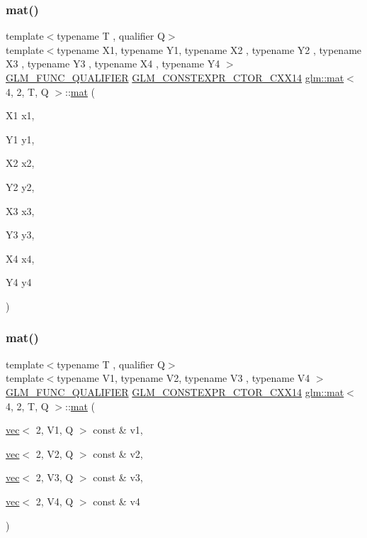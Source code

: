 \subsubsection{\texorpdfstring{mat()}{mat()}\hspace{0.1cm}{\footnotesize\ttfamily [19/21]}}
{\footnotesize\ttfamily template$<$typename T , qualifier Q$>$ \\
template$<$typename X1, typename Y1, typename X2 , typename Y2 , typename X3 , typename Y3 , typename X4 , typename Y4 $>$ \\
\hyperlink{setup_8hpp_a33fdea6f91c5f834105f7415e2a64407}{G\+L\+M\+\_\+\+F\+U\+N\+C\+\_\+\+Q\+U\+A\+L\+I\+F\+I\+ER} \hyperlink{setup_8hpp_a0900f9145e68bf6061b6f5e7be3fa751}{G\+L\+M\+\_\+\+C\+O\+N\+S\+T\+E\+X\+P\+R\+\_\+\+C\+T\+O\+R\+\_\+\+C\+X\+X14} \hyperlink{structglm_1_1mat}{glm\+::mat}$<$ 4, 2, T, Q $>$\+::\hyperlink{structglm_1_1mat}{mat} (\begin{DoxyParamCaption}\item[{X1}]{x1,  }\item[{Y1}]{y1,  }\item[{X2}]{x2,  }\item[{Y2}]{y2,  }\item[{X3}]{x3,  }\item[{Y3}]{y3,  }\item[{X4}]{x4,  }\item[{Y4}]{y4 }\end{DoxyParamCaption})}

\mbox{\label{structglm_1_1mat_3_014_00_012_00_01_t_00_01_q_01_4_ae4f422e3a1f8e3fa42d2782ec06a8200}} 
\subsubsection{\texorpdfstring{mat()}{mat()}\hspace{0.1cm}{\footnotesize\ttfamily [20/21]}}
{\footnotesize\ttfamily template$<$typename T , qualifier Q$>$ \\
template$<$typename V1, typename V2, typename V3 , typename V4 $>$ \\
\hyperlink{setup_8hpp_a33fdea6f91c5f834105f7415e2a64407}{G\+L\+M\+\_\+\+F\+U\+N\+C\+\_\+\+Q\+U\+A\+L\+I\+F\+I\+ER} \hyperlink{setup_8hpp_a0900f9145e68bf6061b6f5e7be3fa751}{G\+L\+M\+\_\+\+C\+O\+N\+S\+T\+E\+X\+P\+R\+\_\+\+C\+T\+O\+R\+\_\+\+C\+X\+X14} \hyperlink{structglm_1_1mat}{glm\+::mat}$<$ 4, 2, T, Q $>$\+::\hyperlink{structglm_1_1mat}{mat} (\begin{DoxyParamCaption}\item[{\hyperlink{structglm_1_1vec}{vec}$<$ 2, V1, Q $>$ const \&}]{v1,  }\item[{\hyperlink{structglm_1_1vec}{vec}$<$ 2, V2, Q $>$ const \&}]{v2,  }\item[{\hyperlink{structglm_1_1vec}{vec}$<$ 2, V3, Q $>$ const \&}]{v3,  }\item[{\hyperlink{structglm_1_1vec}{vec}$<$ 2, V4, Q $>$ const \&}]{v4 }\end{DoxyParamCaption})}


